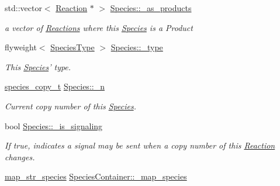\begin{DoxyCompactItemize}
std\-::vector$<$ \hyperlink{classReaction}{Reaction} $\ast$ $>$ \hyperlink{group__Chemistry_ga11b0027a9ca5ac5eb457f2ec64ec28fe}{Species\-::\-\_\-as\-\_\-products}
\begin{DoxyCompactList}\small\item\em a vector of \hyperlink{classReaction}{Reactions} where this \hyperlink{classSpecies}{Species} is a Product \end{DoxyCompactList}\item 
flyweight$<$ \hyperlink{classSpeciesType}{Species\-Type} $>$ \hyperlink{group__Chemistry_ga77c5f76a330d0ef11a438b87877b910e}{Species\-::\-\_\-type}
\begin{DoxyCompactList}\small\item\em This \hyperlink{classSpecies}{Species}' type. \end{DoxyCompactList}\item 
\hyperlink{common_8h_a3503f321fd36304ee274141275cca586}{species\-\_\-copy\-\_\-t} \hyperlink{group__Chemistry_gaec9a5cfb6a2f80e122f6369ae404b89d}{Species\-::\-\_\-n}
\begin{DoxyCompactList}\small\item\em Current copy number of this \hyperlink{classSpecies}{Species}. \end{DoxyCompactList}\item 
bool \hyperlink{group__Chemistry_ga0cc46a3518db8b9e682d1f8544530daf}{Species\-::\-\_\-is\-\_\-signaling}
\begin{DoxyCompactList}\small\item\em If true, indicates a signal may be sent when a copy number of this \hyperlink{classReaction}{Reaction} changes. \end{DoxyCompactList}\item 
\hyperlink{group__Chemistry_ga19c0082cabeed7d195eb9a1bc1aca13f}{map\-\_\-str\-\_\-species} \hyperlink{group__Chemistry_gab3e597371bf2edebc968a6980479e2da}{Species\-Container\-::\-\_\-map\-\_\-species}
\end{DoxyCompactItemize}
